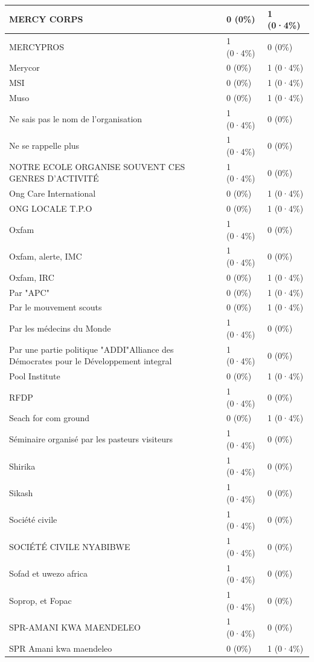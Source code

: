 \documentclass[
]{book}
\begin{document}
\begin{tabular}{l|l|l}
\hline
MERCY CORPS & 0 (0\%) & 1 (0·4\%)\\
\hline
MERCYPROS & 1 (0·4\%) & 0 (0\%)\\
\hline
Merycor & 0 (0\%) & 1 (0·4\%)\\
\hline
MSI & 0 (0\%) & 1 (0·4\%)\\
\hline
Muso & 0 (0\%) & 1 (0·4\%)\\
\hline
Ne sais pas le nom de l'organisation & 1 (0·4\%) & 0 (0\%)\\
\hline
Ne se rappelle plus & 1 (0·4\%) & 0 (0\%)\\
\hline
NOTRE ECOLE ORGANISE SOUVENT CES GENRES D'ACTIVITÉ & 1 (0·4\%) & 0 (0\%)\\
\hline
Ong Care International & 0 (0\%) & 1 (0·4\%)\\
\hline
ONG LOCALE T.P.O & 0 (0\%) & 1 (0·4\%)\\
\hline
Oxfam & 1 (0·4\%) & 0 (0\%)\\
\hline
Oxfam, alerte, IMC & 1 (0·4\%) & 0 (0\%)\\
\hline
Oxfam, IRC & 0 (0\%) & 1 (0·4\%)\\
\hline
Par "APC" & 0 (0\%) & 1 (0·4\%)\\
\hline
Par le mouvement scouts & 0 (0\%) & 1 (0·4\%)\\
\hline
Par les médecins du Monde & 1 (0·4\%) & 0 (0\%)\\
\hline
Par une partie politique "ADDI"Alliance des Démocrates pour le Développement integral & 1 (0·4\%) & 0 (0\%)\\
\hline
Pool Institute & 0 (0\%) & 1 (0·4\%)\\
\hline
RFDP & 1 (0·4\%) & 0 (0\%)\\
\hline
Seach for com ground & 0 (0\%) & 1 (0·4\%)\\
\hline
Séminaire organisé par les pasteurs visiteurs & 1 (0·4\%) & 0 (0\%)\\
\hline
Shirika & 1 (0·4\%) & 0 (0\%)\\
\hline
Sikash & 1 (0·4\%) & 0 (0\%)\\
\hline
Société civile & 1 (0·4\%) & 0 (0\%)\\
\hline
SOCIÉTÉ CIVILE NYABIBWE & 1 (0·4\%) & 0 (0\%)\\
\hline
Sofad et uwezo africa & 1 (0·4\%) & 0 (0\%)\\
\hline
Soprop, et Fopac & 1 (0·4\%) & 0 (0\%)\\
\hline
SPR-AMANI KWA MAENDELEO & 1 (0·4\%) & 0 (0\%)\\
\hline
SPR Amani kwa maendeleo & 0 (0\%) & 1 (0·4\%)\\

\end{tabular}
\end{document}
